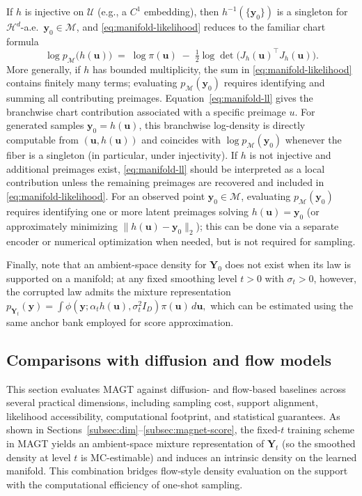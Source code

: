 \documentclass[12pt]{article}
\theoremstyle{definition} %
\newcommand{\M}{\mathcal{M}}
\newcommand{\Y}{\bm Y}
\newcommand{\y}{\bm y}
\providecommand{\method}{MAGT} %
\begin{document}
If $h$ is injective on $\mathcal U$ (e.g., a $C^1$ embedding), then $h^{-1}(\{\y_0\})$ is a singleton for $\mathcal H^d$-a.e.\ $\y_0\in\M$, and \eqref{eq:manifold-likelihood} reduces to the familiar chart formula
\begin{equation}
\label{eq:manifold-ll}
\log p_\M\bigl(h(\bm u)\bigr)
\;=\;
\log \pi(\bm u)\;-\;\tfrac{1}{2}\log\det\!\bigl(J_h(\bm u)^\top J_h(\bm u)\bigr).
\end{equation}
More generally, if $h$ has bounded multiplicity, the sum in \eqref{eq:manifold-likelihood} contains finitely many terms; evaluating $p_\M(\y_0)$ requires identifying and summing all contributing preimages.
Equation~\eqref{eq:manifold-ll} gives the branchwise chart contribution associated with a specific preimage $u$.
For generated samples $\y_0=h(\bm u)$, this branchwise log-density is directly computable from $(\bm u,h(\bm u))$ and coincides with $\log p_\M(\y_0)$ whenever the fiber is a singleton (in particular, under injectivity).
If $h$ is not injective and additional preimages exist, \eqref{eq:manifold-ll} should be interpreted as a local contribution unless the remaining preimages are recovered and included in \eqref{eq:manifold-likelihood}.
For an observed point $\y_0\in\M$, evaluating $p_\M(\y_0)$ requires identifying one or more latent preimages solving $h(\bm u)=\y_0$ (or approximately minimizing $\|h(\bm u)-\y_0\|_2$); this can be done via a separate encoder or numerical optimization when needed, but is not required for sampling.

Finally, note that an ambient-space density for $\Y_0$ does not exist when its law is supported on a manifold; at any fixed smoothing level $t>0$ with $\sigma_t>0$, however, the corrupted law admits the mixture representation
\(
p_{\Y_t}(\y)=\int \phi\!\left(\y;\alpha_t h(\bm u),\sigma_t^2 I_D\right)\pi(\bm u)\,d \bm u,
\)
which can be estimated using the same anchor bank employed for score approximation.


\subsection{Comparisons with diffusion and flow models}
\label{sec:comparison}

This section evaluates {\method{}} against diffusion- and flow-based baselines across several practical dimensions, including sampling cost, support alignment, likelihood accessibility, computational footprint, and statistical guarantees. As shown in Sections~\ref{subsec:dim}--\ref{subsec:magnet-score}, the fixed-$t$ training scheme in \method{} yields an ambient-space mixture representation of $\Y_t$ (so the smoothed density at level $t$ is MC-estimable) and induces an intrinsic density on the learned manifold. This combination bridges flow-style density evaluation on the support with the computational efficiency of one-shot sampling.
\end{document}
